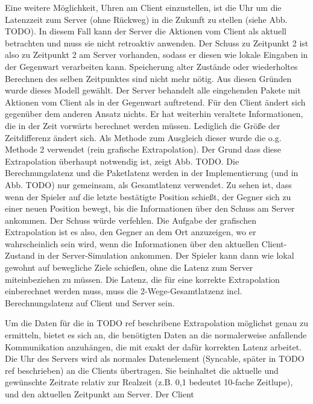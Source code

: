 Eine weitere Möglichkeit, Uhren am Client einzustellen, ist die Uhr um die Latenzzeit zum Server (ohne Rückweg) in die Zukunft zu stellen (siehe Abb. TODO). In diesem Fall kann der Server die Aktionen vom Client als aktuell betrachten und muss sie nicht retroaktiv anwenden. Der Schuss zu Zeitpunkt 2 ist also zu Zeitpunkt 2 am Server vorhanden, sodass er diesen wie lokale Eingaben in der Gegenwart verarbeiten kann. Speicherung alter Zustände oder wiederholtes Berechnen des selben Zeitpunktes sind nicht mehr nötig. Aus diesen Gründen wurde dieses Modell gewählt. Der Server behandelt alle eingehenden Pakete mit Aktionen vom Client als in der Gegenwart auftretend.
Für den Client ändert sich gegenüber dem anderen Ansatz nichts. Er hat weiterhin veraltete Informationen, die in der Zeit vorwärts berechnet werden müssen. Lediglich die Größe der Zeitdifferenz ändert sich. Als Methode zum Ausgleich dieser wurde die o.g. Methode 2 verwendet (rein grafische Extrapolation).
Der Grund dass diese Extrapolation überhaupt notwendig ist, zeigt Abb. TODO. Die Berechnungslatenz und die Paketlatenz werden in der Implementierung (und in Abb. TODO) nur gemeinsam, als Gesamtlatenz verwendet. Zu sehen ist, dass wenn der Spieler auf die letzte bestätigte Position schießt, der Gegner sich zu einer neuen Position bewegt, bis die Informationen über den Schuss am Server ankommen. Der Schuss würde verfehlen. Die Aufgabe der grafischen Extrapolation ist es also, den Gegner an dem Ort anzuzeigen, wo er wahrscheinlich sein wird, wenn die Informationen über den aktuellen Client-Zustand in der Server-Simulation ankommen. Der Spieler kann dann wie lokal gewohnt auf bewegliche Ziele schießen, ohne die Latenz zum Server miteinbeziehen zu müssen.
Die Latenz, die für eine korrekte Extrapolation einberechnet werden muss, muss die 2-Wege-Gesamtlatzenz incl. Berechnungslatenz auf Client und Server sein.


Um die Daten für die in TODO ref beschribene Extrapolation möglichst genau zu ermitteln, bietet es sich an, die benötigten Daten an die normalerweise anfallende Kommunikation anzuhängen, die mit exakt der dafür korrekten Latenz arbeitet. Die Uhr des Servers wird als normales Datenelement (Syncable, später in TODO ref beschrieben) an die Clients übertragen. Sie beinhaltet die aktuelle und gewünschte Zeitrate relativ zur Realzeit (z.B. 0,1 bedeutet 10-fache Zeitlupe), und den aktuellen Zeitpunkt am Server. Der Client





